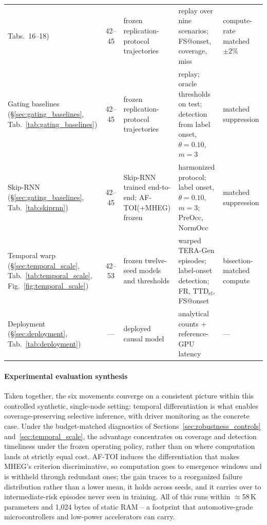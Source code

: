 \documentclass[a4paper,fleqn]{cas-dc}
\newcommand{\TERAGen}{\mbox{TERA-Gen}\xspace}
\newcommand{\AFTOI}{\mbox{AF-TOI}\xspace}
\newcommand{\MHEG}{\mbox{MHEG}\xspace}
\begin{document}
\begin{table}[!tbp]
\begin{tabularx}{\textwidth}{>{\raggedright\arraybackslash}p{2.7cm}
  c >{\raggedright\arraybackslash}p{3.0cm} >{\raggedright\arraybackslash}X
  >{\raggedright\arraybackslash}p{2.4cm}}
Tabs.~16--18) & 42--45 & frozen replication-protocol trajectories
  & replay over nine scenarios; FS@onset, coverage, miss
  & compute-rate matched $\pm2\%$ \\
Gating baselines (\S\ref{sec:gating_baselines},
Tab.~\ref{tab:gating_baselines}) & 42--45 & frozen replication-protocol
  trajectories & replay; oracle thresholds on test; detection from label
  onset, $\theta{=}0.10$, $m{=}3$ & matched suppression \\
Skip-RNN (\S\ref{sec:gating_baselines}, Tab.~\ref{tab:skiprnn}) & 42--45
  & Skip-RNN trained end-to-end; \mbox{AF-TOI}(+\MHEG) frozen
  & harmonized protocol; label onset, $\theta{=}0.10$, $m{=}3$; PreOcc,
    NormOcc & matched suppression \\
Temporal warp (\S\ref{sec:temporal_scale}, Tab.~\ref{tab:temporal_scale},
Fig.~\ref{fig:temporal_scale}) & 42--53 & frozen twelve-seed models and thresholds
  & warped \TERAGen episodes; label-onset detection; FR,
    $\mathrm{TTD}_{\mathrm{ef}}$, FS@onset & bisection-matched compute \\
Deployment (\S\ref{sec:deployment}, Tab.~\ref{tab:deployment}) & ---
  & deployed causal model & analytical counts + reference-GPU latency & --- \\
\bottomrule
\end{tabularx}
\end{table}
\paragraph{Experimental evaluation synthesis}
Taken together, the six movements converge on a consistent picture within this controlled synthetic, single-node setting: temporal differentiation is what enables coverage-preserving selective inference, with driver monitoring as the concrete case. {\color{\revcolor}Under the budget-matched diagnostics of Sections~\ref{sec:robustness_controls} and~\ref{sec:temporal_scale}, the advantage concentrates on coverage and detection timeliness under the frozen operating policy, rather than on where computation lands at strictly equal cost.} \AFTOI induces the differentiation that
makes \MHEG's criterion discriminative, so computation goes to emergence windows and
is withheld through redundant ones; the gain traces to a reorganized
failure distribution rather than a lower mean, it holds across seeds, and it carries
over to intermediate-risk episodes never seen in training. All of this runs within
$\approx$58\,K parameters and 1,024 bytes of static RAM -- a footprint that
automotive-grade microcontrollers and low-power accelerators can carry.
\end{document}
